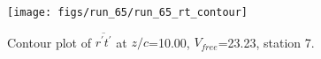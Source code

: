 \begin{figure}[H]
\centering
\texttt{[image: figs/run\_65/run\_65\_rt\_contour]}
\caption{Contour plot of $\overline{r^\prime t^\prime}$ at $z/c$=10.00, $V_{free}$=23.23, station 7.}
\end{figure}


